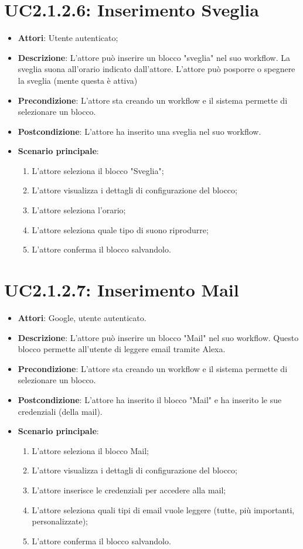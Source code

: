 \section{UC2.1.2.6: Inserimento Sveglia}
\label{UC2.1.2.6}
\begin{itemize}
	\item \textbf{Attori}: Utente autenticato;
	\item \textbf{Descrizione}: L'attore può inserire un blocco "sveglia" nel suo workflow. La sveglia suona all'orario indicato dall'attore. L'attore può posporre o spegnere la sveglia (mente questa è attiva)
	\item \textbf{Precondizione}: L'attore sta creando un workflow e il sistema permette di selezionare un blocco.
	\item \textbf{Postcondizione}: L'attore ha inserito una sveglia nel suo workflow.
	\item \textbf{Scenario principale}:
	\begin{enumerate} \item L'attore seleziona il blocco "Sveglia";  \item L'attore visualizza i dettagli di configurazione del blocco; \item L'attore seleziona l'orario;  \item  L'attore seleziona quale tipo di suono riprodurre; \item L'attore conferma il blocco salvandolo. \end{enumerate}
\end{itemize}

\section{UC2.1.2.7: Inserimento Mail}
\label{UC2.1.2.7}
\begin{itemize}
	\item \textbf{Attori}: Google, utente autenticato.
	\item \textbf{Descrizione}: L'attore può inserire un blocco "Mail" nel suo workflow. Questo blocco permette all'utente di leggere email tramite Alexa.
	\item \textbf{Precondizione}: L'attore sta creando un workflow e il sistema permette di selezionare un blocco.
	\item \textbf{Postcondizione}: L'attore ha inserito il blocco "Mail" e ha inserito le sue credenziali (della mail).
	\item \textbf{Scenario principale}:
	\begin{enumerate} \item L'attore seleziona il blocco Mail;  \item L'attore visualizza i dettagli di configurazione del blocco; \item  L'attore inserisce le credenziali per accedere alla mail;  \item  L'attore seleziona quali tipi di email vuole leggere (tutte, più importanti, personalizzate); \item L'attore conferma il blocco salvandolo.\end{enumerate}
\end{itemize}

